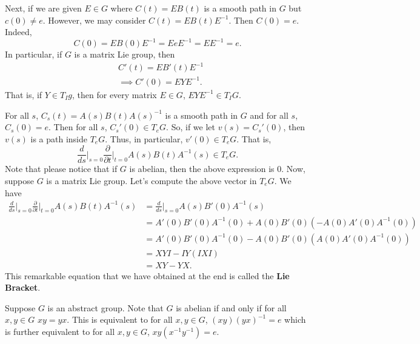 Next, if we are given \( E \in G  \) where \( C(t) = E B(t) \) is a smooth path in \( G  \) but \( c(0) \neq e  \). However, we may consider \( C(t)  = E B(t) E^{-1} \). Then \( C(0) = e  \). Indeed, 
\[  C(0) = E B(0) E^{-1} = E e E^{-1} = E E^{-1} = e.  \]
In particular, if \( G  \) is a matrix Lie group, then
\begin{align*}
    &C'(t) = E B'(t) E^{-1} \\
    &\implies C'(0) = E Y E^{-1}.
\end{align*}
That is, if \( Y \in {T}_{I} g  \), then for every matrix \( E \in G  \), \( E Y E^{-1} \in {T}_{I}G \).

For all \( s  \), \( {C}_{s}(t) = A(s) B(t) A(s)^{-1} \) is a smooth path in \( G  \) and for all \( s  \), \( {C}_{s}(0) = e  \). Then for all \( s  \), \( {C}_{s}'(0) \in {T}_{e} G  \). So, if we let \( v(s) = {C}_{s}'(0) \), then \( v(s) \) is a path inside \( {T}_{e}G  \). Thus, in particular, \( v'(0) \in {T}_{e}G \). That is, 
\[ \frac{ d  }{ ds  } \Big|_{s = 0} \frac{ \partial  }{  \partial t  } \Big|_{t =0} A(s) B(t) A^{-1}(s) \in {T}_{e}G.\]
Note that please notice that if \( G  \) is abelian, then the above expression is \( 0  \). Now, suppose \( G  \) is a matrix Lie group. Let's compute the above vector in \( {T}_{e}G \). We have
\begin{align*}
    \frac{ d }{ ds  }  \Big|_{s = 0} \frac{ \partial  }{ \partial t  }  \Big|_{ t = 0 } A(s) B(t) A^{-1}(s) &= \frac{ d }{ ds  }  \Big|_{s=0 } A(s) B'(0) A^{-1}(s)   \\
                                                                                                            &=  A'(0) B'(0) A^{-1}(0) + A(0) B'(0) (-A(0) A'(0) A^{-1}(0)) \\
                                                                                                            &= A'(0) B'(0) A^{-1}(0) - A(0) B'(0) ( A(0)A'(0) A^{-1}(0)) \\
                                                                                                            &= XYI - I Y(IXI) \\
                                                                                                            &= XY - YX.
\end{align*}
This remarkable equation that we have obtained at the end is called the \textbf{Lie Bracket}.

\begin{remark}[Observation]
    Suppose \( G  \) is an abstract group. Note that \( G  \) is abelian if and only if for all \( x,y \in G   \) \( xy = yx \). This is equivalent to for all \( x,y \in G  \), \( (xy)(yx)^{-1} = e  \) which is further equivalent to for all \( x,y \in G  \), \( xy (x^{-1} y^{-1}) = e  \).   
\end{remark}


